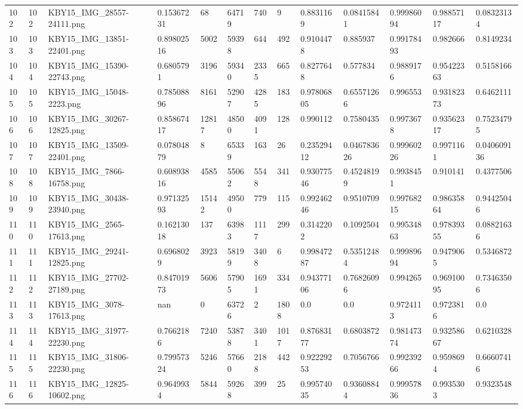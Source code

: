 \documentclass[11pt, a4paper, twoside]{report}
\begin{document}
\begin{longtable}[c]{@{}lllllllllllll@{}}
102 & 102 & KBY15\_IMG\_28557-24111.png & 0.15367231 & 68 & 64719 & 740 & 9 & 0.8831169 & 0.08415841 & 0.99986094 & 0.98857117 & 0.08323134 \\
103 & 103 & KBY15\_IMG\_13851-22401.png & 0.89802516 & 5002 & 59398 & 644 & 492 & 0.9104478 & 0.885937 & 0.99178493 & 0.982666 & 0.8149234 \\
104 & 104 & KBY15\_IMG\_15390-22743.png & 0.6805791 & 3196 & 59340 & 2335 & 665 & 0.8277648 & 0.577834 & 0.9889176 & 0.95422363 & 0.5158166 \\
105 & 105 & KBY15\_IMG\_15048-2223.png & 0.78508896 & 8161 & 52907 & 4285 & 183 & 0.97806805 & 0.65571266 & 0.996553 & 0.93182373 & 0.6462111 \\
106 & 106 & KBY15\_IMG\_30267-12825.png & 0.85867417 & 12817 & 48500 & 4091 & 128 & 0.990112 & 0.7580435 & 0.9973678 & 0.93562317 & 0.75234795 \\
107 & 107 & KBY15\_IMG\_13509-22401.png & 0.07804879 & 8 & 65339 & 163 & 26 & 0.23529412 & 0.046783626 & 0.99960226 & 0.9971161 & 0.040609136 \\
108 & 108 & KBY15\_IMG\_7866-16758.png & 0.60893816 & 4585 & 55062 & 5548 & 341 & 0.93077546 & 0.45248199 & 0.9938451 & 0.910141 & 0.4377506 \\
109 & 109 & KBY15\_IMG\_30438-23940.png & 0.97132593 & 15142 & 49500 & 779 & 115 & 0.99246246 & 0.9510709 & 0.99768215 & 0.98635864 & 0.94425046 \\
110 & 110 & KBY15\_IMG\_2565-17613.png & 0.16213018 & 137 & 63983 & 1117 & 299 & 0.3142202 & 0.1092504 & 0.99534863 & 0.97839355 & 0.08821636 \\
111 & 111 & KBY15\_IMG\_29241-12825.png & 0.6968029 & 3923 & 58199 & 3408 & 6 & 0.99847287 & 0.53512484 & 0.99989694 & 0.9479065 & 0.5346872 \\
112 & 112 & KBY15\_IMG\_27702-27189.png & 0.84701973 & 5606 & 57905 & 1691 & 334 & 0.94377106 & 0.76826096 & 0.994265 & 0.96910095 & 0.73463506 \\
113 & 113 & KBY15\_IMG\_3078-17613.png & nan & 0 & 63726 & 2 & 1808 & 0.0 & 0.0 & 0.9724113 & 0.9723816 & 0.0 \\
114 & 114 & KBY15\_IMG\_31977-22230.png & 0.7662186 & 7240 & 53878 & 3401 & 1017 & 0.87683177 & 0.6803872 & 0.98147374 & 0.93258667 & 0.6210328 \\
115 & 115 & KBY15\_IMG\_31806-22230.png & 0.79957324 & 5246 & 57660 & 2188 & 442 & 0.92229253 & 0.7056766 & 0.99239266 & 0.9598694 & 0.66607416 \\
116 & 116 & KBY15\_IMG\_12825-10602.png & 0.9649934 & 5844 & 59268 & 399 & 25 & 0.99574035 & 0.93608844 & 0.99957836 & 0.9935303 & 0.9323548 \\

\end{longtable}
\end{document}
